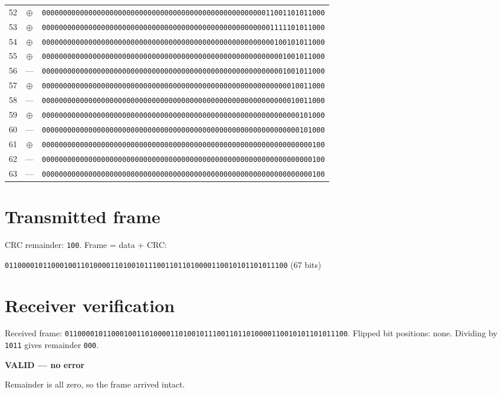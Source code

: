 \documentclass[11pt,a4paper]{article}
\begin{document}
\begin{center}
\begin{tabular}{rcl}
    52 & $\oplus$ & \texttt{0000000000000000000000000000000000000000000000000000011001101011000} \\
    53 & $\oplus$ & \texttt{0000000000000000000000000000000000000000000000000000001111101011000} \\
    54 & $\oplus$ & \texttt{0000000000000000000000000000000000000000000000000000000100101011000} \\
    55 & $\oplus$ & \texttt{0000000000000000000000000000000000000000000000000000000001001011000} \\
    56 & --- & \texttt{0000000000000000000000000000000000000000000000000000000001001011000} \\
    57 & $\oplus$ & \texttt{0000000000000000000000000000000000000000000000000000000000010011000} \\
    58 & --- & \texttt{0000000000000000000000000000000000000000000000000000000000010011000} \\
    59 & $\oplus$ & \texttt{0000000000000000000000000000000000000000000000000000000000000101000} \\
    60 & --- & \texttt{0000000000000000000000000000000000000000000000000000000000000101000} \\
    61 & $\oplus$ & \texttt{0000000000000000000000000000000000000000000000000000000000000000100} \\
    62 & --- & \texttt{0000000000000000000000000000000000000000000000000000000000000000100} \\
    63 & --- & \texttt{0000000000000000000000000000000000000000000000000000000000000000100} \\
\bottomrule
\end{tabular}
\end{center}

\section{Transmitted frame}
CRC remainder: \texttt{100}. Frame = data + CRC:
\begin{center}\texttt{0110000101100010011010000110100101110011011010000110010101101011100} (67 bits)\end{center}

\section{Receiver verification}
Received frame: \texttt{0110000101100010011010000110100101110011011010000110010101101011100}. Flipped bit positions: none.
Dividing by \texttt{1011} gives remainder \texttt{000}.
\begin{center}\textbf{VALID --- no error}\end{center}
Remainder is all zero, so the frame arrived intact.
\end{document}
